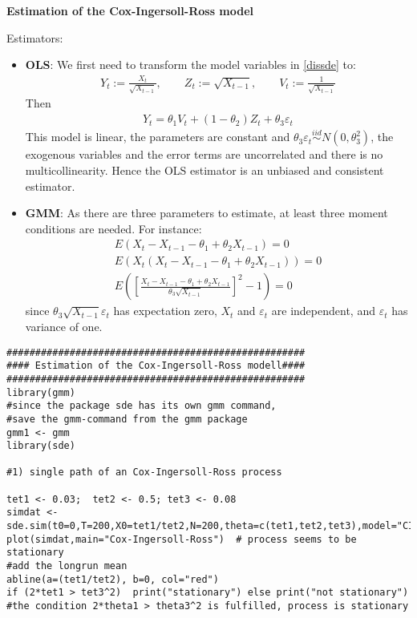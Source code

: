 \documentclass{article}
\begin{document}
\begin{solution}
\textbf{Estimation of the Cox-Ingersoll-Ross model}

Estimators:
\begin{itemize}
  \item \textbf{OLS}: We first need to transform the model variables in \eqref{dissde} to:
      \begin{align*}
        Y_t := \frac{X_t}{\sqrt{X_{t-1}}}, \qquad
        Z_t := \sqrt{X_{t-1}}, \qquad
        V_t := \frac{1}{\sqrt{X_{t-1}}}
      \end{align*}
  Then
  \begin{align*}
    Y_t = \theta_1 V_t + (1-\theta_2)Z_t + \theta_3 \varepsilon_t
  \end{align*}
  This model is linear, the parameters are constant and $\theta_3 \varepsilon_t \overset{iid}{\sim}N(0,\theta_3^2)$, the exogenous variables and the error terms are uncorrelated and there is no multicollinearity. Hence the OLS estimator is an unbiased and consistent estimator.
  \item \textbf{GMM}: As there are three parameters to estimate, at least three moment conditions are needed. For instance:
      \begin{align*}
        E(X_t - X_{t-1}-\theta_1 + \theta_2 X_{t-1}) = 0\\
        E(X_t (X_t - X_{t-1}-\theta_1 + \theta_2 X_{t-1})) = 0\\
        E\left( \left[\frac{X_t - X_{t-1}-\theta_1 + \theta_2 X_{t-1}}{\theta_3 \sqrt{X_{t-1}}}\right]^2-1\right) = 0
      \end{align*}
      since $\theta_3\sqrt{X_{t-1}}\varepsilon_t$ has expectation zero, $X_t$ and $\varepsilon_t$ are independent, and $\varepsilon_t$ has variance of one.
\end{itemize}
\begin{verbatim}
####################################################
#### Estimation of the Cox-Ingersoll-Ross modell####
####################################################
library(gmm)
#since the package sde has its own gmm command,
#save the gmm-command from the gmm package
gmm1 <- gmm
library(sde)

#1) single path of an Cox-Ingersoll-Ross process

tet1 <- 0.03;  tet2 <- 0.5; tet3 <- 0.08
simdat <- sde.sim(t0=0,T=200,X0=tet1/tet2,N=200,theta=c(tet1,tet2,tet3),model="CIR")
plot(simdat,main="Cox-Ingersoll-Ross")  # process seems to be stationary
#add the longrun mean
abline(a=(tet1/tet2), b=0, col="red")
if (2*tet1 > tet3^2)  print("stationary") else print("not stationary")
#the condition 2*theta1 > theta3^2 is fulfilled, process is stationary



\end{verbatim}
\end{solution}
\end{document}
